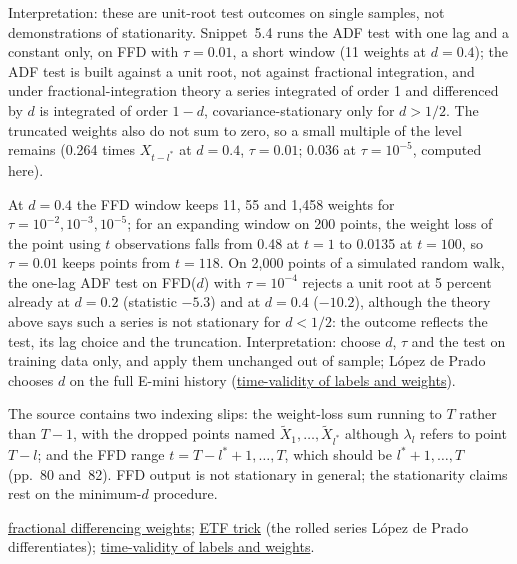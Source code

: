 \begin{qfmethod}
Interpretation: these are unit-root test outcomes on single samples, not demonstrations of stationarity. Snippet~5.4 runs the ADF test with one lag and a constant only, on FFD with $\tau=0.01$, a short window (11 weights at $d=0.4$); the ADF test is built against a unit root, not against fractional integration, and under fractional-integration theory a series integrated of order 1 and differenced by $d$ is integrated of order $1-d$, covariance-stationary only for $d>1/2$. The truncated weights also do not sum to zero, so a small multiple of the level remains (0.264 times $X_{t-l^*}$ at $d=0.4$, $\tau=0.01$; 0.036 at $\tau=10^{-5}$, computed here).

 At $d=0.4$ the FFD window keeps 11, 55 and 1,458 weights for $\tau=10^{-2},10^{-3},10^{-5}$; for an expanding window on 200 points, the weight loss of the point using $t$ observations falls from 0.48 at $t=1$ to 0.0135 at $t=100$, so $\tau=0.01$ keeps points from $t=118$. On 2,000 points of a simulated random walk, the one-lag ADF test on FFD($d$) with $\tau=10^{-4}$ rejects a unit root at 5 percent already at $d=0.2$ (statistic $-5.3$) and at $d=0.4$ ($-10.2$), although the theory above says such a series is not stationary for $d<1/2$: the outcome reflects the test, its lag choice and the truncation. Interpretation: choose $d$, $\tau$ and the test on training data only, and apply them unchanged out of sample; López de Prado chooses $d$ on the full E-mini history (\hyperref[pit:label-weight-leakage]{time-validity of labels and weights}).

 The source contains two indexing slips: the weight-loss sum running to $T$ rather than $T-1$, with the dropped points named $\tilde X_1,\dots,\tilde X_{l^*}$ although $\lambda_l$ refers to point $T-l$; and the FFD range $t=T-l^*+1,\dots,T$, which should be $l^*+1,\dots,T$ (pp.~80 and~82). FFD output is not stationary in general; the stationarity claims rest on the minimum-$d$ procedure.

 \hyperref[mod:fractional-differencing-weights]{fractional differencing weights}; \hyperref[meth:etf-trick]{ETF trick} (the rolled series López de Prado differentiates); \hyperref[pit:label-weight-leakage]{time-validity of labels and weights}.


\end{qfmethod}

